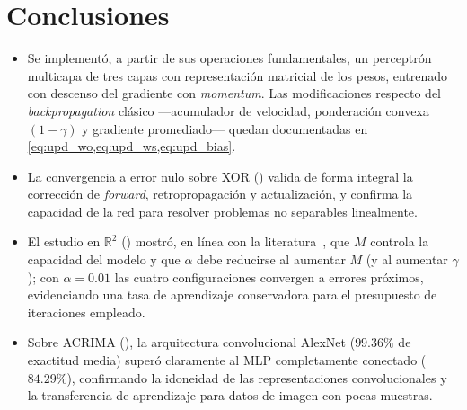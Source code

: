 \documentclass[11pt,a4paper]{article}
\begin{document}
\section{Conclusiones}\label{sec:conclusiones}

\begin{itemize}[leftmargin=1.4em]
  \item Se implementó, a partir de sus operaciones fundamentales, un perceptrón
        multicapa de tres capas con representación matricial de los pesos,
        entrenado con descenso del gradiente con \emph{momentum}. Las
        modificaciones respecto del \emph{backpropagation} clásico —acumulador
        de velocidad, ponderación convexa $(1-\gamma)$ y gradiente promediado—
        quedan documentadas en \cref{eq:upd_wo,eq:upd_ws,eq:upd_bias}.
  \item La convergencia a error nulo sobre XOR () valida de
        forma integral la corrección de \emph{forward}, retropropagación y
        actualización, y confirma la capacidad de la red para resolver problemas
        no separables linealmente.
  \item El estudio en $\mathbb{R}^2$ () mostró, en línea con la
        literatura~\cite{cybenko1989,hornik1989,geman1992}, que $M$ controla la
        capacidad del modelo y que $\alpha$ debe reducirse al aumentar $M$ (y al
        aumentar $\gamma$); con $\alpha=0.01$ las cuatro configuraciones
        convergen a errores próximos, evidenciando una tasa de aprendizaje
        conservadora para el presupuesto de iteraciones empleado.
  \item Sobre ACRIMA (), la arquitectura convolucional AlexNet
        ($99.36\%$ de exactitud media) superó claramente al MLP completamente
        conectado ($84.29\%$), confirmando la idoneidad de las representaciones
        convolucionales y la transferencia de aprendizaje para datos de imagen
        con pocas muestras.
\end{itemize}



\end{document}
